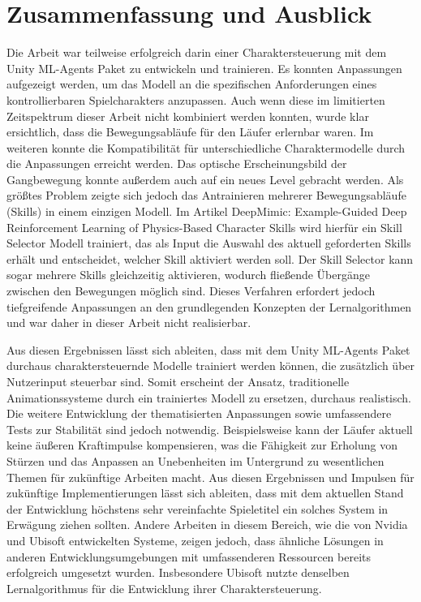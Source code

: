 \chapter{Zusammenfassung und Ausblick}
\label{sec:zusammenfassung_ausblick}
Die Arbeit war teilweise erfolgreich darin einer Charaktersteuerung mit dem Unity ML-Agents Paket zu entwickeln und trainieren. Es konnten Anpassungen aufgezeigt werden, um das Modell an die spezifischen Anforderungen eines kontrollierbaren Spielcharakters anzupassen. Auch wenn diese im limitierten Zeitspektrum dieser Arbeit nicht kombiniert werden konnten, wurde klar ersichtlich, dass die Bewegungsabläufe für den Läufer erlernbar waren. Im weiteren konnte die Kompatibilität für unterschiedliche Charaktermodelle durch die Anpassungen erreicht werden. Das optische Erscheinungsbild der Gangbewegung konnte außerdem auch auf ein neues Level gebracht werden. Als größtes Problem zeigte sich jedoch das Antrainieren mehrerer Bewegungsabläufe (Skills) in einem einzigen Modell. Im Artikel \grqq{}DeepMimic: Example-Guided Deep Reinforcement Learning of Physics-Based Character Skills\grqq{} wird hierfür ein Skill Selector Modell trainiert, das als Input die Auswahl des aktuell geforderten Skills erhält und entscheidet, welcher Skill aktiviert werden soll. Der Skill Selector kann sogar mehrere Skills gleichzeitig aktivieren, wodurch fließende Übergänge zwischen den Bewegungen möglich sind.\cite{peng2018deepmimic} Dieses Verfahren erfordert jedoch tiefgreifende Anpassungen an den grundlegenden Konzepten der Lernalgorithmen und war daher in dieser Arbeit nicht realisierbar.

Aus diesen Ergebnissen lässt sich ableiten, dass mit dem Unity ML-Agents Paket durchaus charaktersteuernde Modelle trainiert werden können, die zusätzlich über Nutzerinput steuerbar sind. Somit erscheint der Ansatz, traditionelle Animationssysteme durch ein trainiertes Modell zu ersetzen, durchaus realistisch. Die weitere Entwicklung der thematisierten Anpassungen sowie umfassendere Tests zur Stabilität sind jedoch notwendig. Beispielsweise kann der Läufer aktuell keine äußeren Kraftimpulse kompensieren, was die Fähigkeit zur Erholung von Stürzen und das Anpassen an Unebenheiten im Untergrund zu wesentlichen Themen für zukünftige Arbeiten macht. Aus diesen Ergebnissen und Impulsen für zukünftige Implementierungen lässt sich ableiten, dass mit dem aktuellen Stand der Entwicklung höchstens sehr vereinfachte Spieletitel ein solches System in Erwägung ziehen sollten. Andere Arbeiten in diesem Bereich, wie die von Nvidia und Ubisoft entwickelten Systeme, zeigen jedoch, dass ähnliche Lösungen in anderen Entwicklungsumgebungen mit umfassenderen Ressourcen bereits erfolgreich umgesetzt wurden.\cite{2022-TOG-ASE}\cite{10.1145/3355089.3356536} Insbesondere Ubisoft nutzte denselben Lernalgorithmus für die Entwicklung ihrer Charaktersteuerung.

